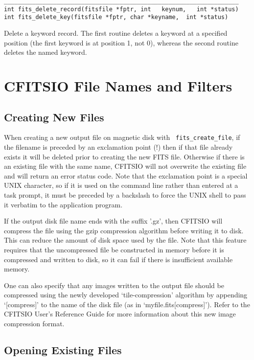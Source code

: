 \documentclass[11pt]{article}
\begin{document}
\begin{verbatim}
___________________________________________________________________
int fits_delete_record(fitsfile *fptr, int   keynum,   int *status)
int fits_delete_key(fitsfile *fptr, char *keyname,  int *status)
\end{verbatim}

Delete a keyword record. The first routine deletes a keyword at a
specified position (the first keyword is at position 1, not 0),
whereas the second routine deletes the named keyword.

\newpage
\section{CFITSIO File Names and Filters}

\subsection{Creating New Files}

When creating a new output file on magnetic disk  with {\tt
fits\_create\_file}, if the filename is preceded by an exclamation
point (!) then if that file already exists it will be deleted prior to
creating the new FITS file.  Otherwise if there is an existing file
with the same name, CFITSIO will not overwrite the existing file and
will return an error status code.  Note  that the exclamation point is
a special UNIX character, so if it is used on the command line rather
than entered at a task prompt, it must be preceded by a backslash to
force the UNIX shell to pass it verbatim to the application program.

If the output disk file name ends with the suffix '.gz', then CFITSIO
will compress the file using the gzip compression algorithm before
writing it to disk.  This can reduce the amount of disk space used by
the file.  Note that this feature requires that the uncompressed file
be constructed in memory before it is compressed and written to disk,
so it can fail if there is insufficient available memory.

One can also specify that any images written to the output file should
be compressed using the newly developed `tile-compression' algorithm by
appending `[compress]' to the name of the disk file (as in
`myfile.fits[compress]').   Refer to the CFITSIO User's Reference Guide
for more information about this new image compression format.

\subsection{Opening Existing Files}
\end{document}
